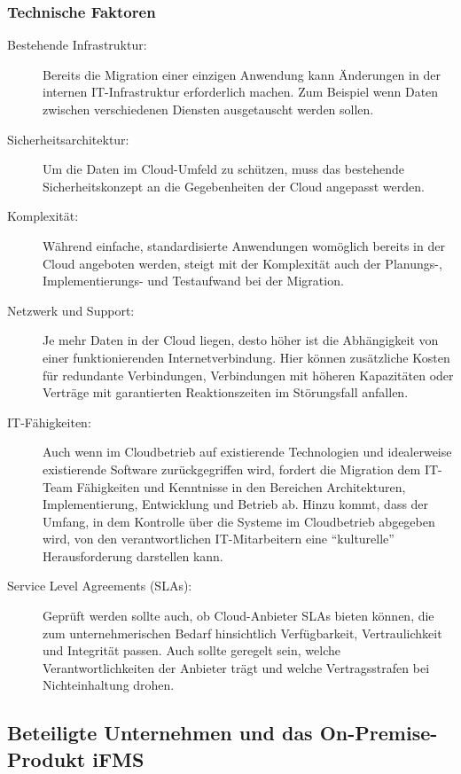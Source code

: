 \subsubsection{Technische Faktoren}
\begin{description}
	\item[Bestehende Infrastruktur:] Bereits die Migration einer
einzigen Anwendung kann Änderungen in der internen IT-Infrastruktur
erforderlich machen. Zum Beispiel wenn Daten zwischen verschiedenen Diensten
ausgetauscht werden sollen.

	\item[Sicherheitsarchitektur:] Um die Daten im Cloud-Umfeld zu
schützen, muss das bestehende Sicherheitskonzept an die Gegebenheiten der Cloud
angepasst werden.

	\item[Komplexität:]
	Während einfache, standardisierte Anwendungen womöglich bereits in der
Cloud angeboten werden, steigt mit der Komplexität auch der Planungs-,
Implementierungs- und Testaufwand bei der Migration.

	\item[Netzwerk und Support:] Je mehr Daten in der Cloud liegen, desto
höher ist die Abhängigkeit von einer funktionierenden Internetverbindung. Hier
können zusätzliche Kosten für redundante Verbindungen, Verbindungen mit höheren
Kapazitäten oder Verträge mit garantierten Reaktionszeiten im Störungsfall
anfallen.

	\item[IT-Fähigkeiten:] Auch wenn im Cloudbetrieb auf existierende
Technologien und idealerweise existierende Software zurückgegriffen wird,
fordert die Migration dem IT-Team Fähigkeiten und Kenntnisse in den Bereichen
Architekturen, Implementierung, Entwicklung und Betrieb ab. Hinzu kommt, dass
der Umfang, in dem Kontrolle über die Systeme im Cloudbetrieb abgegeben wird,
von den verantwortlichen IT-Mitarbeitern eine "`kulturelle"' Herausforderung
darstellen kann.

	\item[Service Level Agreements (SLAs):] Geprüft werden sollte auch, ob
Cloud-Anbieter SLAs bieten können, die zum unternehmerischen Bedarf
hinsichtlich Verfügbarkeit, Vertraulichkeit und Integrität passen. Auch sollte
geregelt sein, welche Verantwortlichkeiten der Anbieter trägt und welche
Vertragsstrafen bei Nichteinhaltung drohen.
\end{description}


\subsection{Beteiligte Unternehmen und das On-Premise-Produkt iFMS}
\label{cha:replyundifms}

